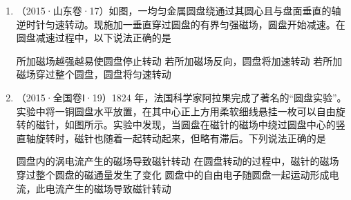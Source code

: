 \documentclass[\gkver]{gaokaozhenti}
\newcommand{\source}[1]{{\sffamily（#1）}}
\begin{document}
\begin{enumerate}[resume]
{故选 C。
}

\item
\source{2015·山东卷·17}如图，一均匀金属圆盘绕通过其圆心且与盘面垂直的轴逆时针匀速转动。现施加一垂直穿过圆盘的有界匀强磁场，圆盘开始减速。在圆盘减速过程中，以下说法正确的是


{所加磁场越强越易使圆盘停止转动}
{若所加磁场反向，圆盘将加速转动}
{若所加磁场穿过整个圆盘，圆盘将匀速转动}


\item
\source{2015·全国卷Ⅰ·19}1824 年，法国科学家阿拉果完成了著名的“圆盘实验”。实验中将一铜圆盘水平放置，在其中心正上方用柔软细线悬挂一枚可以自由旋转的磁针，如图所示。实验中发现，当圆盘在磁针的磁场中绕过圆盘中心的竖直轴旋转时，磁针也随着一起转动起来，但略有滞后。下列说法正确的是

\onepicture[h=4.3cm]{}

{圆盘内的涡电流产生的磁场导致磁针转动}
{在圆盘转动的过程中，磁针的磁场穿过整个圆盘的磁通量发生了变化}
{圆盘中的自由电子随圆盘一起运动形成电流，此电流产生的磁场导致磁针转动}


\end{enumerate}
\end{document}
